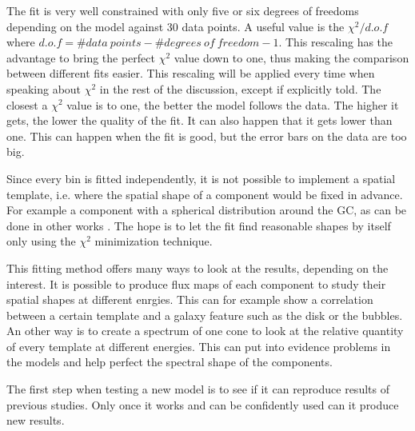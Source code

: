 The fit is very well constrained with only five or six degrees of freedoms depending on the model against 30 data points. A useful value is the $\chi^2 / d.o.f$ where $d.o.f = \#data\ points - \#degrees\ of\ freedom - 1$. This rescaling has the advantage to bring the perfect $\chi^2$ value down to one, thus making the comparison between different fits easier. This rescaling will be applied every time when speaking about $\chi^2$ in the rest of the discussion, except if explicitly told. 
The closest a $\chi^2$ value is to one, the better the model follows the data. The higher it gets, the lower the quality of the fit. It can also happen that it gets lower than one. This can happen when the fit is good, but the error bars on the data are too big.

Since every bin is fitted independently, it is not possible to implement a spatial template, i.e. where the spatial shape of a component would be fixed in advance. For example a component with a spherical distribution around the GC, as can be done in other works %
. The hope is to let the fit find reasonable shapes by itself only using the $\chi ^2$ minimization technique.




This fitting method offers many ways to look at the results, depending on the interest. It is possible to produce flux maps of each component to study their spatial shapes at different enrgies. This can for example show a correlation between a certain template and a galaxy feature such as the disk or the bubbles. An other way is to create a spectrum of one cone to look at the relative quantity of every template at different energies. This can put into evidence problems in the models and help perfect the spectral shape of the components.

The first step when testing a new model is to see if it can reproduce results of previous studies. Only once it works and can be confidently used can it produce new results.




